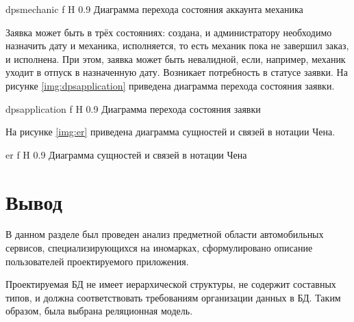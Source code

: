{dpsmechanic}
{f}
{H}
{0.9\textwidth}
{Диаграмма перехода состояния аккаунта механика}

Заявка может быть в трёх состояниях: создана, и администратору необходимо назначить дату и механика, исполняется, то есть механик пока не завершил заказ, и исполнена. 
При этом, заявка может быть невалидной, если, например, механик уходит в отпуск в назначенную дату.
Возникает потребность в статусе заявки.
На рисунке \ref{img:dpsapplication} приведена диаграмма перехода состояния заявки.

{dpsapplication}
{f}
{H}
{0.9\textwidth}
{Диаграмма перехода состояния заявки}

На рисунке \ref{img:er} приведена диаграмма сущностей и связей в нотации Чена.

{er}
{f}
{H}
{0.9\textwidth}
{Диаграмма сущностей и связей в нотации Чена}

\section*{Вывод}

В данном разделе был проведен анализ предметной области автомобильных сервисов, специализирующихся на иномарках, сформулировано описание пользователей проектируемого приложения.

Проектируемая БД не имеет иерархической структуры, не содержит составных типов, и должна соответствовать требованиям организации данных в БД. Таким образом, была выбрана реляционная модель.



 







